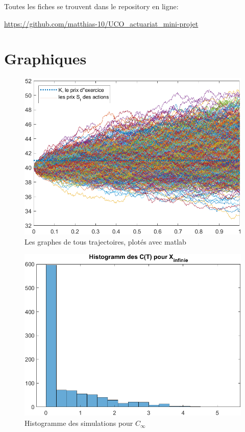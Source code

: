 \documentclass[a4paper,12pt]{scrartcl}
\begin{document}
\begin{center}
Toutes les fiches se trouvent dans le repository en ligne: 

 \url{https://github.com/matthias-10/UCO_actuariat_mini-projet}
\end{center}

\section{Graphiques} \label{graphiques}

\begin{figure}[h!]
  \begin{center}
    \includegraphics[width=14cm]{"graphiques/S.png"}
    \caption{Les graphes de tous trajectoires, plotés avec matlab}
    \label{fig:S}
  \end{center}
\end{figure}

\begin{figure}[h!]
  \begin{center}
    \includegraphics[width=14cm]{"graphiques/hist_C_inf.png"}
    \caption{Histogramme des simulations pour $C_{\infty}$}
    \label{fig:hist_C_inf}
  \end{center}
\end{figure}
\end{document}
